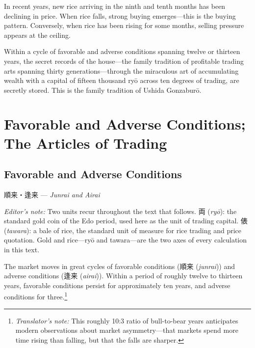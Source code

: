 \documentclass[10pt, openany]{book}
\newcommand{\jp}[1]{{\japanesefont #1}}
\newcommand{\tn}[1]{\footnote{\textit{Translator's note:} #1}}
\newcommand{\jt}[2]{\jp{#1} (\textit{#2})}
\newenvironment{editorialnote}{%
  \begin{editorbox}\small\textit{Editor's note:}\enspace}{\end{editorbox}}
\begin{document}
In recent years, new rice arriving in the ninth and tenth months has been
declining in price. When rice falls, strong buying emerges---this is the
buying pattern. Conversely, when rice has been rising for some months,
selling pressure appears at the ceiling.

Within a cycle of favorable and adverse conditions spanning twelve or
thirteen years, the secret records of the house---the family tradition of
profitable trading arts spanning thirty generations---through the
miraculous art of accumulating wealth with a capital of fifteen thousand
ry\=o across ten degrees of trading, are secretly stored. This is the
family tradition of Ushida Gonzabur\=o.

\chapter{Favorable and Adverse Conditions;\\ The Articles of Trading}

\section{Favorable and Adverse Conditions}

\begin{center}
\jp{順来・逢来} --- \textit{Junrai and Airai}
\end{center}

\vspace{0.5em}

\begin{editorialnote}
Two units recur throughout the text that follows.
\jt{両}{ry\=o}: the standard gold coin of the Edo period, used here as
the unit of trading capital. \jt{俵}{tawara}: a bale of rice, the
standard unit of measure for rice trading and price quotation. Gold and
rice---ry\=o and tawara---are the two axes of every calculation in this
text.
\end{editorialnote}

The market moves in great cycles of favorable conditions
(\jt{順来}{junrai}) and adverse conditions (\jt{逢来}{airai}). Within a
period of roughly twelve to thirteen years, favorable conditions persist for
approximately ten years, and adverse conditions for three.\tn{This roughly
10:3 ratio of bull-to-bear years anticipates modern observations about
market asymmetry---that markets spend more time rising than falling, but
that the falls are sharper.}
\end{document}
